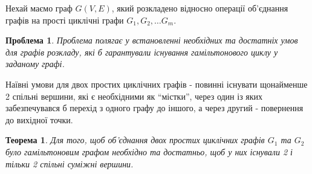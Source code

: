\documentclass[a4paper,14pt,ukrainian]{extarticle}
\newtheorem{problem}{Проблема}
\newtheorem{theorem}{Теорема}
\begin{document}
    Нехай маємо граф $G(V,E)$, який розкладено відносно операції об’єднання графів на прості циклічні графи $G_1, G_2, \dots G_m$.
    \begin{problem}
        Проблема полягає у встановленні необхідних та достатніх умов для графів розкладу, які б гарантували існування гамільтонового циклу у заданому графі.
    \end{problem}
    Наївні умови для двох простих циклічних графів - повинні існувати щонайменше 2 спільні вершини, які є необхідними як ``містки'', через один із яких забезпечувався б перехід з одного графу до іншого, а через другий - повернення до вихідної точки.
    \begin{theorem}
    \label{JoinOfTwoCycleGraphs}
        Для того, щоб об’єднання двох простих циклічних графів $G_1$ та $G_2$ було гамільтоновим графом необхідно та достатньо, щоб у них існували 2 і тільки 2 спільні суміжні вершини.
    \end{theorem}
\end{document}
